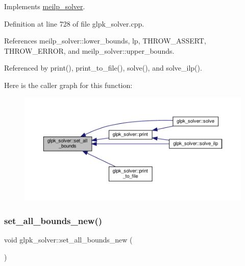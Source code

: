 Implements \hyperlink{classmeilp__solver_abf7a38326551db34e423396517198895}{meilp\+\_\+solver}.



Definition at line 728 of file glpk\+\_\+solver.\+cpp.



References meilp\+\_\+solver\+::lower\+\_\+bounds, lp, T\+H\+R\+O\+W\+\_\+\+A\+S\+S\+E\+RT, T\+H\+R\+O\+W\+\_\+\+E\+R\+R\+OR, and meilp\+\_\+solver\+::upper\+\_\+bounds.



Referenced by print(), print\+\_\+to\+\_\+file(), solve(), and solve\+\_\+ilp().

Here is the caller graph for this function\+:
\nopagebreak
\begin{figure}[H]
\begin{center}
\leavevmode
\includegraphics[width=350pt]{db/d0a/classglpk__solver_a452c9cc528757df64c8afd83274e5ae5_icgraph}
\end{center}
\end{figure}
\mbox{\label{classglpk__solver_a20a1d445c2a04318a6161207e2528d17}} 
\subsubsection{\texorpdfstring{set\+\_\+all\+\_\+bounds\+\_\+new()}{set\_all\_bounds\_new()}}
{\footnotesize\ttfamily void glpk\+\_\+solver\+::set\+\_\+all\+\_\+bounds\+\_\+new (\begin{DoxyParamCaption}{ }\end{DoxyParamCaption})\hspace{0.3cm}{\ttfamily [private]}}



